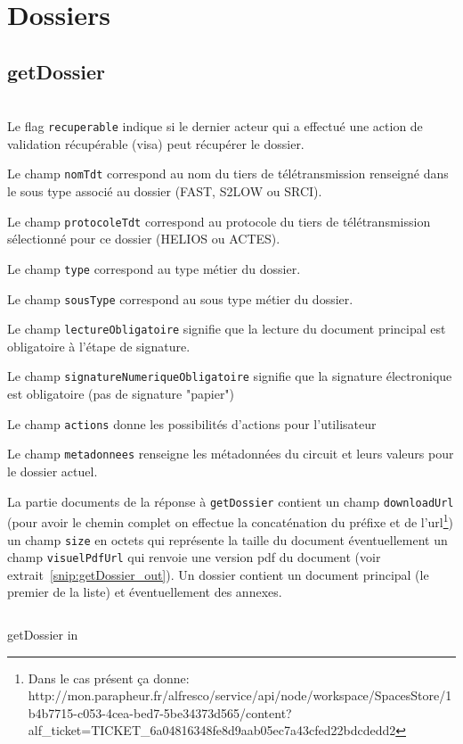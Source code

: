 \section{Dossiers}

\subsection{getDossier}
\\


Le flag \verb|recuperable| indique si le dernier acteur qui a effectué une action de validation récupérable (visa) peut récupérer le dossier.

Le champ \verb|nomTdt| correspond au nom du tiers de télétransmission renseigné dans le sous type associé au dossier (FAST, S2LOW ou SRCI).

Le champ \verb|protocoleTdt| correspond au protocole du tiers de télétransmission sélectionné pour ce dossier (HELIOS ou ACTES).

Le champ \verb|type| correspond au type métier du dossier.

Le champ \verb|sousType| correspond au sous type métier du dossier.

Le champ \verb|lectureObligatoire| signifie que la lecture du document principal est obligatoire à l'étape de signature.

Le champ \verb|signatureNumeriqueObligatoire| signifie que la signature électronique est obligatoire (pas de signature "papier")

Le champ \verb|actions| donne les possibilités d'actions pour l'utilisateur

Le champ \verb|metadonnees| renseigne les métadonnées du circuit et leurs valeurs pour le dossier actuel.

La partie documents de la réponse à \verb|getDossier| contient un champ \verb|downloadUrl| (pour avoir le chemin complet on effectue la concaténation du préfixe et de l'url\footnote{Dans le cas présent ça donne: http://mon.parapheur.fr/alfresco/service/api/node/workspace/SpacesStore/1b4b7715-c053-4cea-bed7-5be34373d565/content?alf\_ticket=TICKET\_6a04816348fe8d9aab05ec7a43cfed22bdcdedd2}) un champ \verb|size| en octets qui représente la taille du document éventuellement un champ \verb|visuelPdfUrl| qui renvoie une version pdf du document (voir extrait~\ref{snip:getDossier_out}). Un dossier contient un document principal (le premier de la liste) et éventuellement des annexes.

\begin{codesnippet}
\inputminted[frame=single,linenos,fontsize=\footnotesize]{javascript}{extraits/getDossier_in.js}
\caption{getDossier in}
\label{snip:getDossier_out}
\end{codesnippet}


